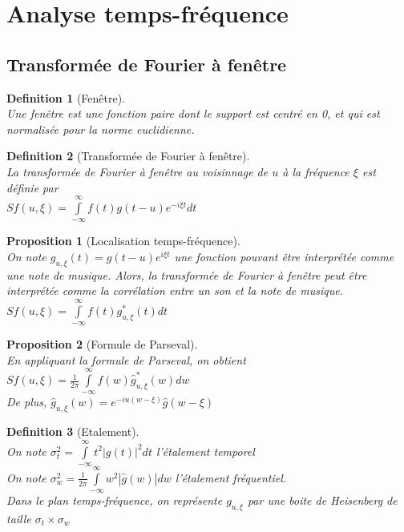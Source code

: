 \documentclass[a4paper]{article}
\newtheorem*{prop}{Proposition}
\newtheorem*{definition}{Definition}
\renewcommand{\(}{\left(}
\renewcommand{\)}{\right)}
\begin{document}
\section{Analyse temps-fréquence}

\subsection{Transformée de Fourier à fenêtre}

\begin{definition}[Fenêtre]~\\
  Une fenêtre est une fonction paire dont le support est centré en 0, et qui est
  normalisée pour la norme euclidienne.
\end{definition}

\begin{definition}[Transformée de Fourier à fenêtre]~\\
  La transformée de Fourier à fenêtre au voisinnage de $u$ à la fréquence $\xi$
  est définie par\\
  $Sf(u,\xi) = \int\limits_{-\infty}^{\infty}f(t)g(t-u)e^{-i\xi t}dt$
\end{definition}

\begin{prop}[Localisation temps-fréquence]~\\
  On note $g_{u,\xi}(t) = g(t-u)e^{i\xi t}$ une fonction pouvant être
  interprétée comme une note de musique. Alors, la transformée de Fourier à
  fenêtre peut être interprétée comme la corrélation entre un son et la note de musique.\\
  $Sf(u,\xi) = \int\limits_{-\infty}^{\infty}f(t)g^*_{u,\xi}(t)dt$
\end{prop}

\begin{prop}[Formule de Parseval]~\\
  En appliquant la formule de Parseval, on obtient\\
  $Sf(u,\xi) = \frac{1}{2\pi}
  \int\limits_{-\infty}^{\infty}\hat{f}(w)\hat{g}^*_{u,\xi}(w)dw$\\
  De plus, $\hat{g}_{u,\xi}(w) = e^{-iu(w-\xi)}\hat{g}(w-\xi)$
\end{prop}

\begin{definition}[Etalement]~\\
  On note $\sigma_t^2 = \int\limits_{-\infty}^{\infty}t^2|g(t)|^2dt$ l'étalement temporel\\
  On note $\sigma_w^2 = \frac{1}{2\pi}\int\limits_{-\infty}^{\infty}w^2|\hat{g}(w)|dw$
  l'étalement fréquentiel.\\
  Dans le plan temps-fréquence, on représente $g_{u,\xi}$ par une boite de
  Heisenberg de taille $\sigma_t \times \sigma_w$
\end{definition}
\end{document}
